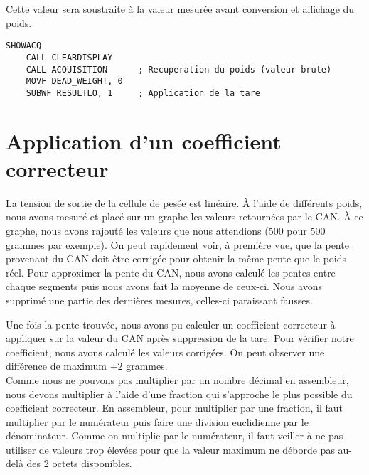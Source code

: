 \documentclass[a4paper,11pt,titlepage]{article}
\begin{document}
Cette valeur sera soustraite à la valeur mesurée avant conversion et affichage du poids.\\

\begin{lstlisting}
SHOWACQ
    CALL CLEARDISPLAY
    CALL ACQUISITION      ; Recuperation du poids (valeur brute)
    MOVF DEAD_WEIGHT, 0   
    SUBWF RESULTLO, 1     ; Application de la tare
\end{lstlisting}

\section{Application d'un coefficient correcteur}

La tension de sortie de la cellule de pesée est linéaire. À l'aide de différents poids, nous avons mesuré et placé sur un graphe les valeurs retournées par le CAN. À ce graphe, nous avons rajouté les valeurs que nous attendions (500 pour 500 grammes par exemple). On peut rapidement voir, à première vue, que la pente provenant du CAN doit être corrigée pour obtenir la même pente que le poids réel. Pour approximer la pente du CAN, nous avons calculé les pentes entre chaque segments puis nous avons fait la moyenne de ceux-ci. Nous avons supprimé une partie des dernières mesures, celles-ci paraissant fausses.\\


Une fois la pente trouvée, nous avons pu calculer un coefficient correcteur à appliquer sur la valeur du CAN après suppression de la tare. Pour vérifier notre coefficient, nous avons calculé les valeurs corrigées. On peut observer une différence de maximum $\pm{2}$ grammes.\\

Comme nous ne pouvons pas multiplier par un nombre décimal en assembleur, nous devons multiplier à l'aide d'une fraction qui s'approche le plus possible du coefficient correcteur. En assembleur, pour multiplier par une fraction, il faut multiplier par le numérateur puis faire une division euclidienne par le dénominateur. Comme on multiplie par le numérateur, il faut veiller à ne pas utiliser de valeurs trop élevées pour que la valeur maximum ne déborde pas au-delà des 2 octets disponibles.\\
\end{document}
